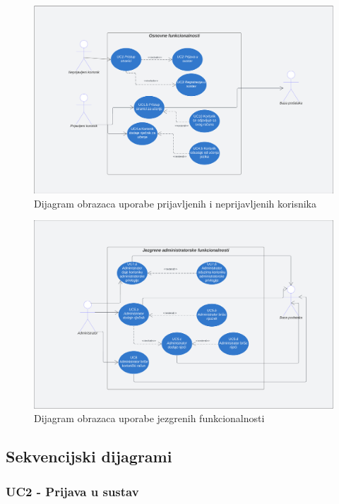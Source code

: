 				\begin{figure}[H]
					\includegraphics[scale=0.5]{dijagrami/Prijava.png} 
					\centering
					\caption{Dijagram obrazaca uporabe prijavljenih i neprijavljenih korisnika}
					\label{fig:class_diagram}
				\end{figure}
				\eject
				\begin{figure}[H]
					\includegraphics[scale=0.5]{dijagrami/Jezgrene.png} 
					\centering
					\caption{Dijagram obrazaca uporabe jezgrenih funkcionalnosti} 
					\label{fig:class_diagram}
				\end{figure}
				\eject
				
				


			\subsection{Sekvencijski dijagrami}
					\subsubsection{UC2 - Prijava u sustav}

